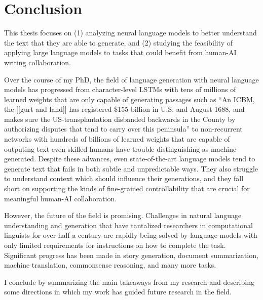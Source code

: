 \chapter{Conclusion}

This thesis focuses on (1) analyzing neural language models to better understand the text that they are able to generate, and (2) studying the feasibility of applying large language models to tasks that could benefit from human-AI writing collaboration.

Over the course of my PhD, the field of language generation with neural language models has progressed from character-level LSTMs with tens of millions of learned weights that are only capable of generating passages such as ``{An ICBM, the [[gurt and land]] has registered \$155 billion in U.S. and August 1688, and makes sure the US-transplantation disbanded backwards in the County by authorizing disputes that tend to carry over this peninsula}'' \citep{graves2013generating} to non-recurrent networks with hundreds of billions of learned weights that are capable of outputing text even skilled humans  have trouble distinguishing as machine-generated.
Despite these advances, even state-of-the-art language models tend to generate text that fails in both subtle and unpredictable ways.
They also struggle to understand context which should influence their generations, and they fall short on supporting the kinds of fine-grained controllability that are crucial for meaningful human-AI collaboration.

However, the future of the field is promising.
Challenges in natural language understanding and generation that have tantalized researchers in computational linguists for over half a century are rapidly being solved by language models with only limited requirements for instructions on how to complete the task.
Significant progress has been made in story generation, document summarization, machine translation, commonsense reasoning, and many more tasks.

I conclude by summarizing the main takeaways from my research and describing some directions in which my work has guided future research in the field.

